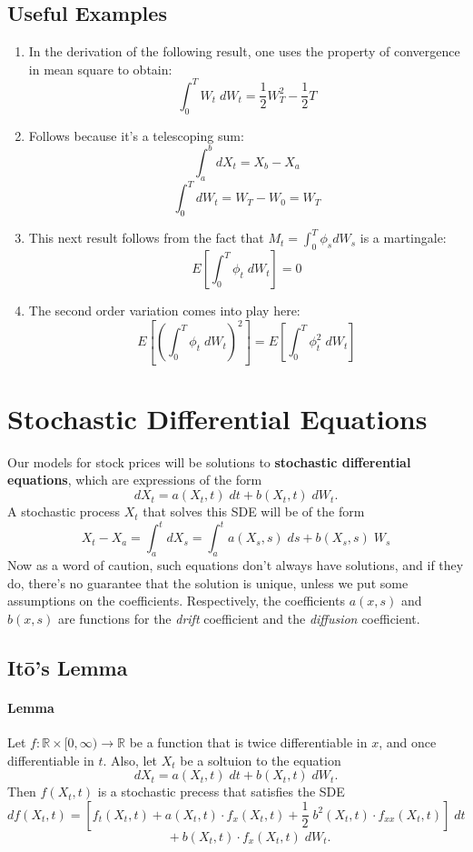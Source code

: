 \documentclass[a4paper,12pt]{scrartcl}
\begin{document}
\subsection{Useful Examples}

\begin{enumerate} 
   \item{In the derivation of the following result, 
      one uses the property of 
      convergence in mean square to obtain:
      \[ \int_0^T W_t \; dW_t = \frac{1}{2} W_T^2 - \frac{1}{2} T \]}
   \item{Follows because it's a telescoping sum:
      \[ \int_a^b dX_t = X_b - X_a  \]
      \[ \int_0^T dW_t = W_T - W_0 = W_T \]}
   \item{This next result follows from the fact that $M_t = \int_0^T
      \phi_s dW_s$ is a martingale:
      \[ E\left[\int_0^T \phi_t \; dW_t\right] = 0 \]}
   \item{The second order variation comes into play here: 
      \[ E\left[\left(\int_0^T \phi_t \; dW_t\right)^2\right] = 
      E\left[\int_0^T \phi^2_t \; dW_t\right] \]}
\end{enumerate}
   



\section{Stochastic Differential Equations}

Our models for stock prices will be solutions to \textbf{stochastic
differential equations}, which are expressions of the form
\begin{equation}
   \label{sde}
   dX_t = a(X_t,t)\;dt + b(X_t,t)\;dW_t. 
\end{equation}
A stochastic process $X_t$ that solves this SDE will be of the form 
   \[ X_t - X_a = \int_a^t dX_s = \int_a^t a(X_s,s)\;ds + b(X_s,s)\;W_s
      \]
Now as a word of caution, such equations don't always have solutions, and
if they do, there's no guarantee that the solution is unique, unless
we put some assumptions on the coefficients.  Respectively, the 
coefficients $a(x,s)$ and $b(x,s)$ are functions for the \emph{drift}
coefficient and the \emph{diffusion} coefficient.

\subsection{It\={o}'s Lemma}

\paragraph{Lemma} Let $f: \mathbb{R}\times [0,\infty) \rightarrow 
\mathbb{R}$ be a function that is twice differentiable in $x$, and
once differentiable in $t$. Also, let $X_t$ be a soltuion to the equation
   \[ dX_t = a(X_t,t)\; dt + b(X_t,t)\; dW_t.\]
Then $f(X_t,t)$ is a stochastic precess that satisfies the SDE
   \[ df(X_t,t) = \left[f_t(X_t,t) + a(X_t,t) \cdot f_x(X_t,t)
      + \frac{1}{2}\; b^2(X_t,t)\cdot f_{xx}(X_t,t)\right]\;dt \]
   \[ \qquad + b(X_t,t)\cdot f_x(X_t,t)\;dW_t. \]
\end{document}
